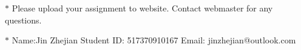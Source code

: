 \documentclass[12pt,a4paper]{article}
\theoremstyle{definition}
\begin{document}
\noindent

\noindent{}
\begin{center}
\footnotesize{\color{red}$*$ Please upload your assignment to website. Contact webmaster for any questions.}

\footnotesize{\color{blue}$*$ Name:Jin Zhejian	\quad Student ID: 517370910167 \quad Email: jinzhejian@outlook.com}
\end{center}
\end{document}
